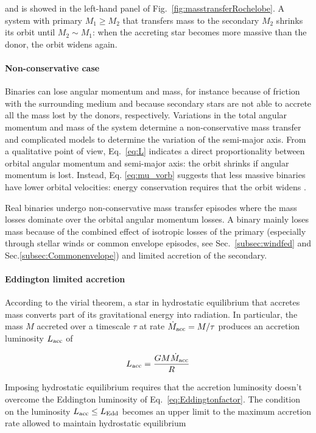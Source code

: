 \documentclass[a4paper,titlepage]{book}     	%
\newcommand{\mdot}{\ensuremath{\dot{M}}}
\begin{document}
and is showed in the left-hand panel of Fig.\ \ref{fig:masstransferRochelobe}. A system with primary $M_1 \geq M_2$ that transfers mass to the secondary $M_2$ shrinks its orbit until $M_2 \sim M_1$: when the accreting star becomes more massive than the donor, the orbit widens again.

\paragraph{Non-conservative case} Binaries can lose angular momentum and mass, for instance because of friction with the surrounding medium and because secondary stars are not able to accrete all the mass lost by the donors, respectively. Variations in the total angular momentum and mass of the system determine a non-conservative mass transfer and complicated models to determine the variation of the semi-major axis. From a qualitative point of view, Eq.\ \ref{eq:L} indicates a direct proportionality between orbital angular momentum and semi-major axis: the orbit shrinks if angular momentum is lost. Instead, Eq. \ref{eq:mu_vorb} suggests that less massive binaries have lower orbital velocities: energy conservation requires that the orbit widens \cite{Hurley2002}. 

Real binaries undergo non-conservative mass transfer episodes where the mass losses dominate over the orbital angular momentum losses. A binary mainly loses mass because of the combined effect of isotropic losses of the primary (especially through stellar winds or common envelope episodes, see Sec.\ \ref{subsec:windfed} and Sec.\ref{subsec:Commonenvelope}) and limited accretion of the secondary. 

\paragraph{Eddington limited accretion}
According to the virial theorem, a star in hydrostatic equilibrium that accretes mass converts part of its gravitational energy into radiation. In particular, the mass $M$ accreted over a timescale $\tau$ at rate $\mdot_{\rm acc} = M/\tau$ produces an accretion luminosity $L_{\rm acc}$ of

\begin{equation}
L_\textup{acc} = \frac{G M \mdot_{\rm acc}}{R}
\end{equation}

Imposing hydrostatic equilibrium requires that the accretion luminosity doesn't overcome the Eddington luminosity of Eq.\ \ref{eq:Eddingtonfactor}. The condition on the luminosity $L_{\rm acc} \leq L_{\rm Edd}$ becomes an upper limit to the maximum accretion rate allowed to maintain hydrostatic equilibrium
\end{document}
